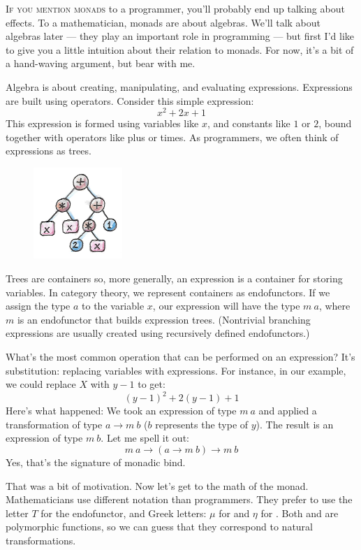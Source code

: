 
\lettrine[lhang=0.17]{I}{f you mention monads} to a programmer, you'll probably end up talking
about effects. To a mathematician, monads are about algebras. We'll talk
about algebras later --- they play an important role in programming ---
but first I'd like to give you a little intuition about their relation
to monads. For now, it's a bit of a hand-waving argument, but bear with
me.

Algebra is about creating, manipulating, and evaluating expressions.
Expressions are built using operators. Consider this simple expression:
\[x^2 + 2 x + 1\]
This expression is formed using variables like $x$, and constants
like $1$ or $2$, bound together with operators like plus or times. As
programmers, we often think of expressions as trees.

\begin{figure}[H]
\centering
\includegraphics[width=0.3\textwidth]{images/exptree.png}
\end{figure}

\noindent
Trees are containers so, more generally, an expression is a container
for storing variables. In category theory, we represent containers as
endofunctors. If we assign the type $a$ to the variable
$x$, our expression will have the type $m\ a$, where
$m$ is an endofunctor that builds expression trees. (Nontrivial
branching expressions are usually created using recursively defined
endofunctors.)

What's the most common operation that can be performed on an expression?
It's substitution: replacing variables with expressions. For instance,
in our example, we could replace $X$ with $y - 1$ to
get:
\[(y - 1)^2 + 2 (y - 1) + 1\]
Here's what happened: We took an expression of type $m\ a$ and
applied a transformation of type $a \to m\ b$
($b$ represents the type of $y$). The result is an
expression of type $m\ b$. Let me spell it out:
\[m\ a \to (a \to m\ b) \to m\ b\]
Yes, that's the signature of monadic bind.

That was a bit of motivation. Now let's get to the math of the monad.
Mathematicians use different notation than programmers. They prefer to
use the letter $T$ for the endofunctor, and Greek letters: $\mu$ for
 and $\eta$ for . Both  and
 are polymorphic functions, so we can guess that they
correspond to natural transformations.

